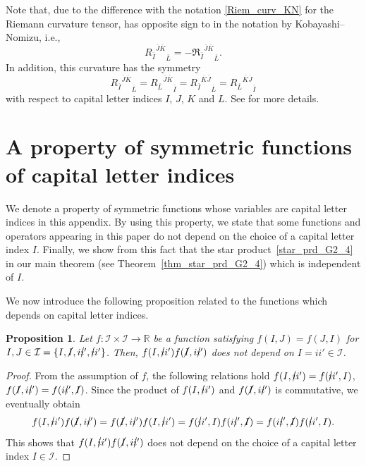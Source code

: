 \documentclass[10pt,a4paper]{amsart}
\numberwithin{equation}{section}
\newtheorem{Proposition}[Theorem]{Proposition}
 { \theoremstyle{definition}
\newtheorem{Definition}[Theorem]{Definition}
\newtheorem{Note}[Theorem]{Note}
\newtheorem{Example}[Theorem]{Example}
\newtheorem{Remark}[Theorem]{Remark} }
\begin{document}
Note that, due to the difference with the notation \eqref{Riem_curv_KN} for the Riemann curvature tensor,  has opposite sign to  in the notation by Kobayashi--Nomizu, i.e.,
\[
{{R_{\overline{I}}}^{\overline{J} \overline{K}}}_{\overline{L}}
= -{{\mathfrak{R}_{\overline{I}}}^{\overline{J} \overline{K}}}_{\overline{L}}.
\] In addition, this curvature has the symmetry
\[
 {{R_{\overline{I}}}^{\overline{J} \overline{K}}}_{\overline{L}}
 =
 {{R_{\overline{L}}}^{\overline{J} \overline{K}}}_{\overline{I}}
 =
 {{R_{\overline{I}}}^{\overline{K} \overline{J}}}_{\overline{L}}
 =
 {{R_{\overline{L}}}^{\overline{K} \overline{J}}}_{\overline{I}}
\] with respect to capital letter indices $I$, $J$, $K$ and $L$. See \cite{HS1,OS_jrnl} for more details.

\section{A property of symmetric functions of capital letter indices}
\label{appendix_symmetry_function}

We denote a property of symmetric functions whose variables are capital letter indices in this appendix. By using this property, we state that some functions and operators appearing in this paper do not depend on the choice of a capital letter index $I$. Finally, we show from this fact that the star product~\eqref{star_prd_G2_4} in our main theorem (see Theorem~\ref{thm_star_prd_G2_4}) which is independent of $I$.

We now introduce the following proposition related to the functions which depends on capital letter indices.
\begin{Proposition}\label{prop_app_sym_fct}
Let
$
f\colon
\mathcal{I}
\times
\mathcal{I}
\to
\mathbb{R}
$
be a function satisfying
$
f(I,J)
=
f(J,I)
$
for
$
I,J
\in
\mathcal{I}
=
\{
I,
\cancel{I},
i\cancel{i}',
\cancel{i}i'
\}
$.
Then,
$
f(I,\cancel{i}i')
f(\cancel{I},i\cancel{i}')
$
does not depend on
$
I
=
ii'
\in
\mathcal{I}
$.
\end{Proposition}

\begin{proof}
From the assumption of $f$, the following relations hold
$
f(I,\cancel{i}i')
=
f(\cancel{i}i',I)$,
$
f(\cancel{I},i\cancel{i}')
=
f(i\cancel{i}',\cancel{I})$.
Since the product of
$
f(I,\cancel{i}i')
$
and
$
f(\cancel{I},i\cancel{i}')
$
is commutative, we eventually obtain
\begin{align*}
f(I,\cancel{i}i')
f(\cancel{I},i\cancel{i}')
=
f(\cancel{I},i\cancel{i}')
f(I,\cancel{i}i')
=
f(\cancel{i}i',I)
f(i\cancel{i}',\cancel{I})
=
f(i\cancel{i}',\cancel{I})
f(\cancel{i}i',I).
\end{align*}
This shows that
$
f(I,\cancel{i}i')
f(\cancel{I},i\cancel{i}')
$
does not depend on the choice of a capital letter index $I\in\mathcal{I}$.%
\end{proof}
\end{document}
